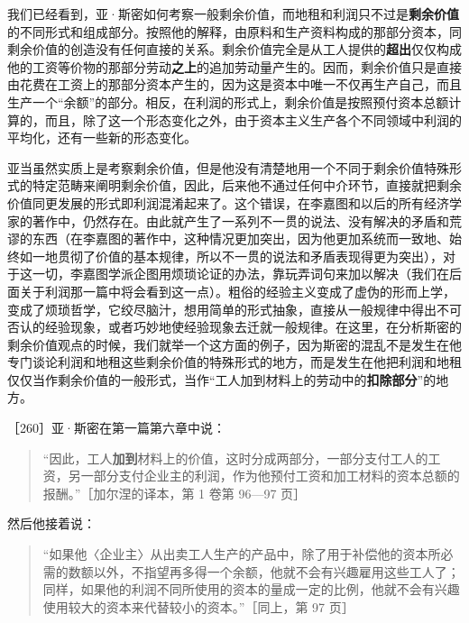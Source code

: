 
我们已经看到，亚·斯密如何考察一般剩余价值，而地租和利润只不过是\textbf{剩余价值}的不同形式和组成部分。按照他的解释，由原料和生产资料构成的那部分资本，同剩余价值的创造没有任何直接的关系。剩余价值完全是从工人提供的\textbf{超出}仅仅构成他的工资等价物的那部分劳动\textbf{之上}的追加劳动量产生的。因而，剩余价值只是直接由花费在工资上的那部分资本产生的，因为这是资本中唯一不仅再生产自己，而且生产一个“余额”的部分。相反，在利润的形式上，剩余价值是按照预付资本总额计算的，而且，除了这一个形态变化之外，由于资本主义生产各个不同领域中利润的平均化，还有一些新的形态变化。

亚当虽然实质上是考察剩余价值，但是他没有清楚地用一个不同于剩余价值特殊形式的特定范畴来阐明剩余价值，因此，后来他不通过任何中介环节，直接就把剩余价值同更发展的形式即利润混淆起来了。这个错误，在李嘉图和以后的所有经济学家的著作中，仍然存在。由此就产生了一系列不一贯的说法、没有解决的矛盾和荒谬的东西（在李嘉图的著作中，这种情况更加突出，因为他更加系统而一致地、始终如一地贯彻了价值的基本规律，所以不一贯的说法和矛盾表现得更为突出），对于这一切，李嘉图学派企图用烦琐论证的办法，靠玩弄词句来加以解决（我们在后面关于利润那一篇中将会看到这一点）。粗俗的经验主义变成了虚伪的形而上学，变成了烦琐哲学，它绞尽脑汁，想用简单的形式抽象，直接从一般规律中得出不可否认的经验现象，或者巧妙地使经验现象去迁就一般规律。在这里，在分析斯密的剩余价值观点的时候，我们就举一个这方面的例子，因为斯密的混乱不是发生在他专门谈论利润和地租这些剩余价值的特殊形式的地方，而是发生在他把利润和地租仅仅当作剩余价值的一般形式，当作“工人加到材料上的劳动中的\textbf{扣除部分}”的地方。

［260］亚·斯密在第一篇第六章中说：

\begin{quote}“因此，工人\textbf{加到}材料上的价值，这时分成两部分，一部分支付工人的工资，另一部分支付企业主的利润，作为他预付工资和加工材料的资本总额的报酬。”［加尔涅的译本，第 1 卷第 96—97 页］\end{quote}

然后他接着说：

\begin{quote}“如果他〈企业主〉从出卖工人生产的产品中，除了用于补偿他的资本所必需的数额以外，不指望再多得一个余额，他就不会有兴趣雇用这些工人了；同样，如果他的利润不同所使用的资本的量成一定的比例，他就不会有兴趣使用较大的资本来代替较小的资本。”［同上，第 97 页］\end{quote}

